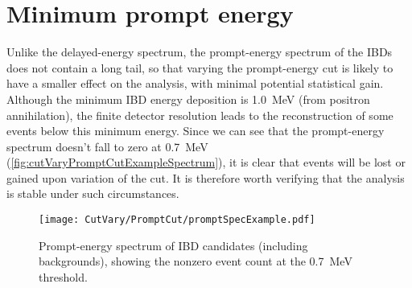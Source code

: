 \documentclass[../thesis.tex]{subfiles}
\begin{document}
\section{Minimum prompt energy}
\label{sec:cutVaryMinPrompt}

Unlike the delayed-energy spectrum, the prompt-energy spectrum of the IBDs does not contain a long tail, so that varying the prompt-energy cut is likely to have a smaller effect on the analysis, with minimal potential statistical gain. Although the minimum IBD energy deposition is 1.0~MeV (from positron annihilation), the finite detector resolution leads to the reconstruction of some events below this minimum energy. Since we can see that the prompt-energy spectrum doesn't fall to zero at 0.7~MeV (\autoref{fig:cutVaryPromptCutExampleSpectrum}), it is clear that events will be lost or gained upon variation of the cut. It is therefore worth verifying that the analysis is stable under such circumstances.

\begin{figure}[h]
  \texttt{[image: CutVary/PromptCut/promptSpecExample.pdf]}
  \caption{Prompt-energy spectrum of IBD candidates (including backgrounds), showing the nonzero event count at the 0.7~MeV threshold.}
  \label{fig:cutVaryPromptCutExampleSpectrum}
\end{figure}
\end{document}
